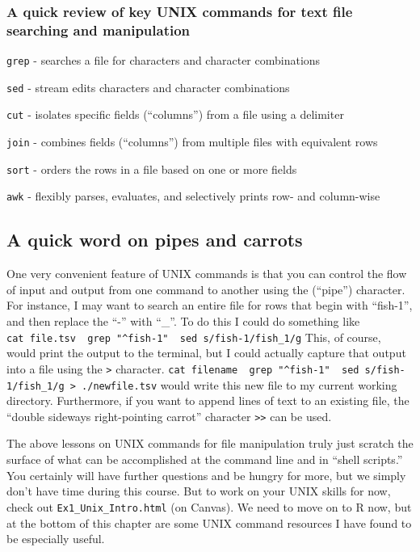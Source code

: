 \documentclass[]{book}
\begin{document}
\hypertarget{a-quick-review-of-key-unix-commands-for-text-file-searching-and-manipulation}{%
\subsubsection{A quick review of key UNIX commands for text file searching and manipulation}\label{a-quick-review-of-key-unix-commands-for-text-file-searching-and-manipulation}}

\texttt{grep} - searches a file for characters and character combinations

\texttt{sed} - stream edits characters and character combinations

\texttt{cut} - isolates specific fields (``columns'') from a file using a delimiter

\texttt{join} - combines fields (``columns'') from multiple files with equivalent rows

\texttt{sort} - orders the rows in a file based on one or more fields

\texttt{awk} - flexibly parses, evaluates, and selectively prints row- and column-wise

\hypertarget{a-quick-word-on-pipes-and-carrots}{%
\subsection{A quick word on pipes and carrots}\label{a-quick-word-on-pipes-and-carrots}}

One very convenient feature of UNIX commands is that you can control the flow of input and output from one command to another using the \texttt{\textbar{}} (``pipe'') character. For instance, I may want to search an entire file for rows that begin with ``fish-1'', and then replace the ``-'' with ``\_''. To do this I could do something like \texttt{cat\ file.tsv\ \textbar{}\ grep\ "\^{}fish-1"\ \textbar{}\ sed\ \textquotesingle{}s/fish-1/fish\_1/g\textquotesingle{}} This, of course, would print the output to the terminal, but I could actually capture that output into a file using the \texttt{\textgreater{}} character. \texttt{cat\ filename\ \textbar{}\ grep\ "\^{}fish-1"\ \textbar{}\ sed\ \textquotesingle{}s/fish-1/fish\_1/g\textquotesingle{}\ \textgreater{}\ ./newfile.tsv} would write this new file to my current working directory. Furthermore, if you want to append lines of text to an existing file, the ``double sideways right-pointing carrot'' character \texttt{\textgreater{}\textgreater{}} can be used.

The above lessons on UNIX commands for file manipulation truly just scratch the surface of what can be accomplished at the command line and in ``shell scripts.'' You certainly will have further questions and be hungry for more, but we simply don't have time during this course. But to work on your UNIX skills for now, check out \texttt{Ex1\_Unix\_Intro.html} (on Canvas). We need to move on to R now, but at the bottom of this chapter are some UNIX command resources I have found to be especially useful.
\end{document}
